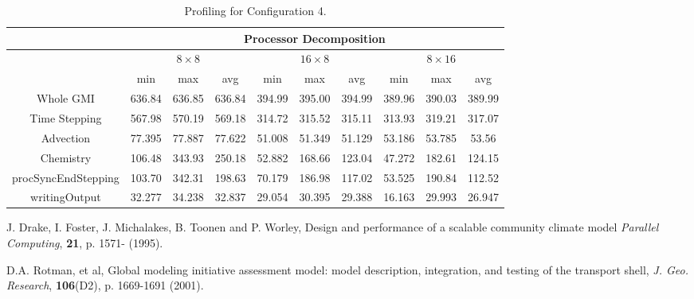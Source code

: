 \begin{table}[!h]
\begin{center}
\begin{tabular}{||c||c|c|c||c|c|c||c|c|c||} \hline\hline
 & \multicolumn{9}{|c|}{\bf Processor Decomposition} \\ \hline
 & \multicolumn{3}{|c|}{$8 \times 8$} & \multicolumn{3}{|c|}{$16 \times 8$} & \multicolumn{3}{|c|}{$8 \times 16$} \\ \hline
 & min & max & avg & min & max & avg & min & max & avg \\ \hline\hline
Whole GMI           &636.84&636.85&636.84&394.99&395.00&394.99&389.96&390.03&389.99 \\
Time Stepping       &567.98&570.19&569.18&314.72&315.52&315.11&313.93&319.21&317.07\\
Advection           &77.395&77.887&77.622&51.008&51.349&51.129&53.186&53.785&53.56\\
Chemistry           &106.48&343.93&250.18&52.882&168.66&123.04&47.272&182.61&124.15\\
procSyncEndStepping &103.70&342.31&198.63&70.179&186.98&117.02&53.525&190.84&112.52\\
writingOutput       &32.277&34.238&32.837&29.054&30.395&29.388&16.163&29.993&26.947\\ \hline\hline
\end{tabular}
\caption{Profiling for Configuration 4.}
\label{tab:wretime4}
\end{center}
\end{table}

\begin{thebibliography}{99}

 J. Drake, I. Foster, J. Michalakes, B. Toonen and
    P. Worley,
    Design and performance of a scalable community climate model
    {\em Parallel Computing}, {\bf 21}, p. 1571- (1995).

 D.A. Rotman, et al,
    Global modeling initiative assessment model: model description,
    integration, and testing of the transport shell,
    {\em J. Geo. Research}, {\bf 106}(D2), p. 1669-1691 (2001).

\end{thebibliography}


